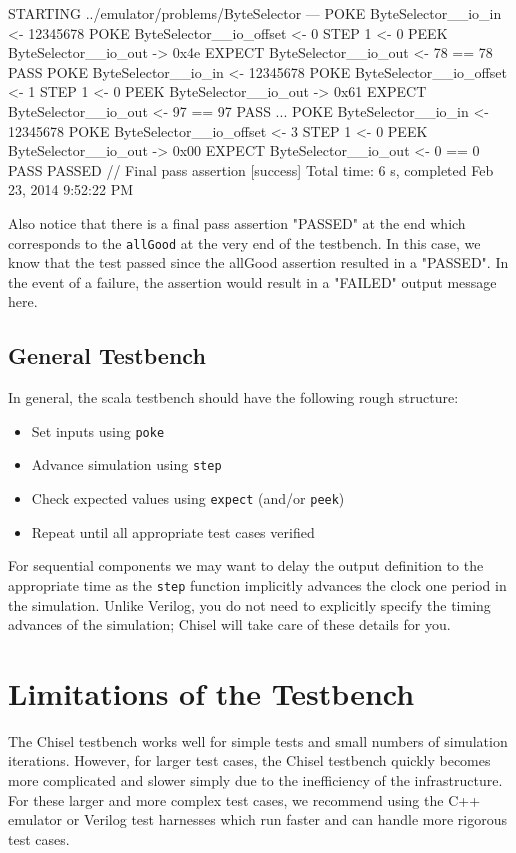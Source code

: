 \begin{bash}
STARTING ../emulator/problems/ByteSelector
---
POKE ByteSelector__io_in <- 12345678
POKE ByteSelector__io_offset <- 0
STEP 1 <- 0
PEEK ByteSelector__io_out -> 0x4e
EXPECT ByteSelector__io_out <- 78 == 78 PASS
POKE ByteSelector__io_in <- 12345678
POKE ByteSelector__io_offset <- 1
STEP 1 <- 0
PEEK ByteSelector__io_out -> 0x61
EXPECT ByteSelector__io_out <- 97 == 97 PASS
...
POKE ByteSelector__io_in <- 12345678
POKE ByteSelector__io_offset <- 3
STEP 1 <- 0
PEEK ByteSelector__io_out -> 0x00
EXPECT ByteSelector__io_out <- 0 == 0 PASS
PASSED   // Final pass assertion
[success] Total time: 6 s, completed Feb 23, 2014 9:52:22 PM
\end{bash}

Also notice that there is a final pass assertion "PASSED" at the end which corresponds to the \verb+allGood+ at the very end of the testbench. In this case, we know that the test passed since the allGood assertion resulted in a "PASSED". In the event of a failure, the assertion would result in a "FAILED" output message here.

\subsection{General Testbench}

In general, the scala testbench should have the following rough structure:

\begin{itemize}
\item Set inputs using \verb+poke+
\item Advance simulation using \verb+step+
\item Check expected values using \verb+expect+ (and/or \verb+peek+)
\item Repeat until all appropriate test cases verified
\end{itemize}

For sequential components we may want to delay the output definition to the appropriate time as the \verb+step+ function implicitly advances the clock one period in the simulation. Unlike Verilog, you do not need to explicitly specify the timing advances of the simulation; Chisel will take care of these details for you.

\section{Limitations of the Testbench}

The Chisel testbench works well for simple tests and small numbers of simulation iterations. However, for larger test cases, the Chisel testbench quickly becomes more complicated and slower simply due to the inefficiency of the infrastructure. For these larger and more complex test cases, we recommend using the C++ emulator or Verilog test harnesses which run faster and can handle more rigorous test cases.

